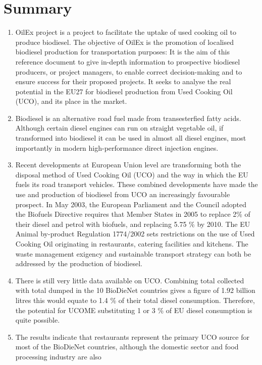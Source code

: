 \documentclass[11pt,fleqn]{book} %
\begin{document}
\section{Summary}
\begin{enumerate}
	\item OilEx project is a project to facilitate the uptake of used cooking oil to produce biodiesel. 
	The objective of OilEx is the promotion of localised biodiesel production for transportation purposes: 
	It is the aim of this reference document to give in-depth information to prospective biodiesel producers, 
	or project managers, to enable correct decision-making and to ensure success for their proposed projects. 
	It seeks to analyse the real potential in the EU27 for biodiesel production from Used Cooking Oil (UCO), 
	and its place in the market.
	\item Biodiesel is an alternative road fuel made from transesterfied fatty acids. Although certain
	diesel engines can run on straight vegetable oil, if transformed into biodiesel it can be
	used in almost all diesel engines, most importantly in modern high-performance direct
	injection engines.
	\item Recent developments at European Union level are transforming both the disposal
	method of Used Cooking Oil (UCO) and the way in which the EU fuels its road transport
	vehicles. These combined developments have made the use and production of biodiesel
	from UCO an increasingly favourable prospect. In May 2003, the European Parliament
	and the Council adopted the Biofuels Directive requires that Member States in 2005 to
	replace 2\% of their diesel and petrol with biofuels, and replacing 5.75 \% by 2010. The EU
	Animal by-product Regulation 1774/2002 sets restrictions on the use of Used Cooking Oil
	originating in restaurants, catering facilities and kitchens. The waste management
	exigency and sustainable transport strategy can both be addressed by the production of
	biodiesel.
	\item There is still very little data available on UCO. Combining total collected with total
	dumped in the 10 BioDieNet countries gives a figure of 1.92 billion litres this would
	equate to 1.4 \% of their total diesel consumption. Therefore, the potential for UCOME
	substituting 1 or 3 \% of EU diesel consumption is quite possible.
	\item The results indicate that restaurants represent the primary UCO source for most of the
	BioDieNet countries, although the domestic sector and food processing industry are also

\end{enumerate}
\end{document}
